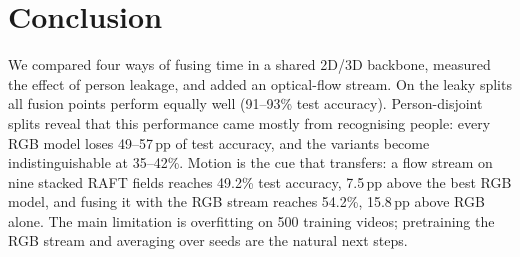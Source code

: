 \section{Conclusion}
\label{sec:conclusion}
We compared four ways of fusing time in a shared 2D/3D backbone, measured
the effect of person leakage, and added an optical-flow stream. On the
leaky splits all fusion points perform equally well (91--93\% test
accuracy). Person-disjoint splits reveal that this performance came mostly
from recognising people: every RGB model loses 49--57\,pp of test
accuracy, and the variants become indistinguishable at 35--42\%. Motion is
the cue that transfers: a flow stream on nine stacked RAFT fields reaches
49.2\% test accuracy, 7.5\,pp above the best RGB model, and fusing it with
the RGB stream reaches 54.2\%, 15.8\,pp above RGB alone.
The main limitation is overfitting on 500 training videos; pretraining the
RGB stream and averaging over seeds are the natural next steps.
